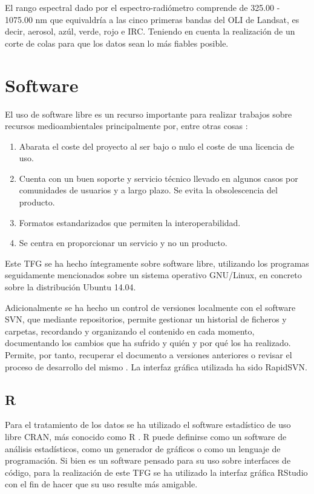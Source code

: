 El rango espectral dado por el espectro-radiómetro comprende de 325.00 - 1075.00 nm que equivaldría a las cinco primeras bandas del \ac{OLI} de Landsat, es decir, aerosol, azúl, verde, rojo e \ac{IRC}. Teniendo en cuenta la realización de un corte de colas para que los datos sean lo más fiables posible.

\section{Software} \label{sec:software}
El uso de software libre es un recurso importante para realizar trabajos sobre recursos medioambientales principalmente por, entre otras cosas \citep{MatellanOliveira2004}:

\begin{enumerate}
	\item Abarata el coste del proyecto al ser bajo o nulo el coste de una licencia de uso.
	\item Cuenta con un buen soporte y servicio técnico llevado en algunos casos por comunidades de usuarios y a largo plazo. Se evita la obsolescencia del producto.
	\item Formatos estandarizados que permiten la interoperabilidad.
	\item Se centra en proporcionar un servicio y no un producto.
\end{enumerate}

Este \ac{TFG} se ha hecho íntegramente sobre software libre, utilizando los programas seguidamente mencionados sobre un sistema operativo GNU/Linux, en concreto sobre la distribución Ubuntu 14.04.\Sep

Adicionalmente se ha hecho un control de versiones localmente con el software \ac{SVN}, que mediante repositorios, permite gestionar un historial de ficheros y carpetas, recordando y organizando el contenido en cada momento, documentando los cambios que ha sufrido y quién y por qué los ha realizado. Permite, por tanto, recuperar el documento a versiones anteriores o revisar el proceso de desarrollo del mismo \citep{Latex2011}. La interfaz gráfica utilizada ha sido RapidSVN.

\subsection{R}
Para el tratamiento de los datos se ha utilizado el software estadístico de uso libre CRAN, más conocido como R \citep{R2013}. R puede definirse como un software de análisis estadísticos, como un generador de gráficos o como un lenguaje de programación. Si bien es un software pensado para su uso sobre interfaces de código, para la realización de este \ac{TFG} se ha utilizado la interfaz gráfica RStudio con el fin de hacer que su uso resulte más amigable.\Sep

